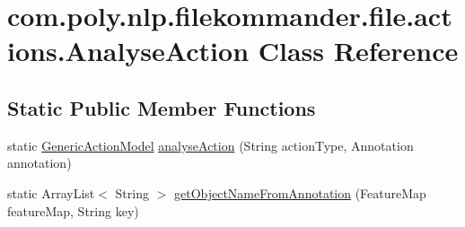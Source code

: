 \hypertarget{classcom_1_1poly_1_1nlp_1_1filekommander_1_1file_1_1actions_1_1_analyse_action}{\section{com.\-poly.\-nlp.\-filekommander.\-file.\-actions.\-Analyse\-Action Class Reference}
\label{classcom_1_1poly_1_1nlp_1_1filekommander_1_1file_1_1actions_1_1_analyse_action}
}
\subsection*{Static Public Member Functions}
\begin{DoxyCompactItemize}
\item 
static \hyperlink{interfacecom_1_1poly_1_1nlp_1_1filekommander_1_1views_1_1models_1_1_generic_action_model}{Generic\-Action\-Model} \hyperlink{classcom_1_1poly_1_1nlp_1_1filekommander_1_1file_1_1actions_1_1_analyse_action_aef5f93dbdd411587de327fc2c6913622}{analyse\-Action} (String action\-Type, Annotation annotation)
\item 
static Array\-List$<$ String $>$ \hyperlink{classcom_1_1poly_1_1nlp_1_1filekommander_1_1file_1_1actions_1_1_analyse_action_a8652e1bba48585a8c416e6e212fe4766}{get\-Object\-Name\-From\-Annotation} (Feature\-Map feature\-Map, String key)
\end{DoxyCompactItemize}
